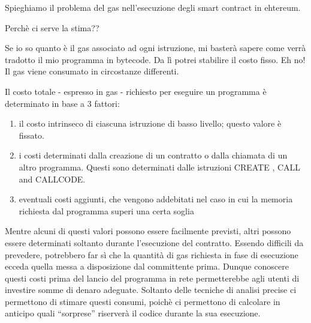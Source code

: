 Spieghiamo il problema del gas nell'esecuzione degli smart contract in ehtereum.

Perchè ci serve la stima??

Se io so quanto è il gas associato ad ogni istruzione, mi basterà sapere come verrà tradotto il mio programma in bytecode. Da lì potrei stabilire il costo fisso. Eh no!
Il gas viene consumato in circostanze differenti.

Il costo totale - espresso in gas - richiesto per eseguire un programma è determinato in base a 3 fattori:
\begin{enumerate}
\item il costo intrinseco di ciascuna istruzione di basso livello; questo valore è fissato.
\item i costi determinati dalla creazione di un contratto o dalla chiamata di un altro programma. Questi sono determinati dalle istruzioni CREATE , CALL and CALLCODE.
\item eventuali costi aggiunti, che vengono addebitati nel caso in cui la memoria richiesta dal programma superi una certa soglia
\end{enumerate}

Mentre alcuni di questi valori possono essere facilmente previsti, altri possono essere determinati soltanto durante l'esecuzione del contratto. Essendo difficili da prevedere, potrebbero far sì che la quantità di gas richiesta in fase di esecuzione ecceda quella messa a disposizione dal committente prima. Dunque conoscere questi costi prima del lancio del programma in rete permetterebbe agli utenti di investire somme di denaro adeguate.\newline
Soltanto delle tecniche di analisi precise ci permettono di stimare questi consumi, poichè ci permettono di calcolare in anticipo quali ``sorprese'' riserverà il codice durante la sua esecuzione.\newline
